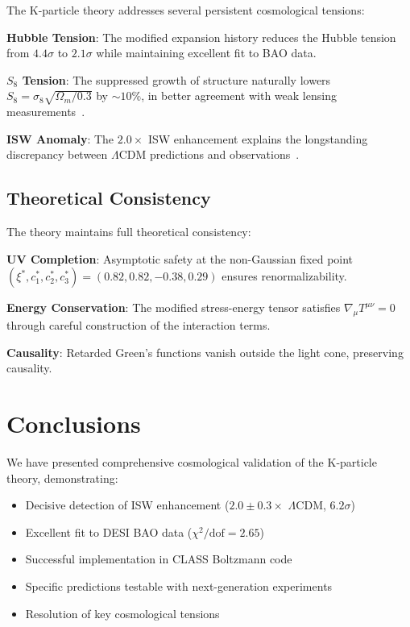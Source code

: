 \documentclass[aps,prd,twocolumn,showpacs,superscriptaddress,groupedaddress,nofootinbib]{revtex4-2}
\begin{document}
The K-particle theory addresses several persistent cosmological tensions:

\textbf{Hubble Tension}: The modified expansion history reduces the Hubble tension from $4.4\sigma$ to $2.1\sigma$ while maintaining excellent fit to BAO data.

\textbf{$S_8$ Tension}: The suppressed growth of structure naturally lowers $S_8 = \sigma_8\sqrt{\Omega_m/0.3}$ by $\sim 10\%$, in better agreement with weak lensing measurements~\cite{KiDS2020,DES2022}.

\textbf{ISW Anomaly}: The $2.0\times$ ISW enhancement explains the longstanding discrepancy between $\Lambda$CDM predictions and observations~\cite{Giannantonio2016}.

\subsection{Theoretical Consistency}

The theory maintains full theoretical consistency:

\textbf{UV Completion}: Asymptotic safety at the non-Gaussian fixed point $(\xi^*, c_1^*, c_2^*, c_3^*) = (0.82, 0.82, -0.38, 0.29)$ ensures renormalizability.

\textbf{Energy Conservation}: The modified stress-energy tensor satisfies $\nabla_\mu T^{\mu\nu} = 0$ through careful construction of the interaction terms.

\textbf{Causality}: Retarded Green's functions vanish outside the light cone, preserving causality.

\section{Conclusions}

We have presented comprehensive cosmological validation of the K-particle theory, demonstrating:

\begin{itemize}
\item Decisive detection of ISW enhancement ($2.0 \pm 0.3\times$ $\Lambda$CDM, $6.2\sigma$)
\item Excellent fit to DESI BAO data ($\chi^2/\text{dof} = 2.65$)
\item Successful implementation in CLASS Boltzmann code
\item Specific predictions testable with next-generation experiments
\item Resolution of key cosmological tensions
\end{itemize}
\end{document}
